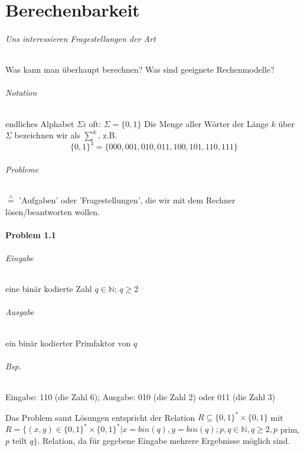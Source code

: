 \part{Berechenbarkeit}

\paragraph*{Uns interessieren Fragestellungen der Art} Was kann man überhaupt berechnen? Was sind geeignete Rechenmodelle?

\paragraph*{Notation} endliches Alphabet $\Sigma i$ oft: $\Sigma = \{ 0,1 \}$ Die Menge aller Wörter der Länge $k$ über $\Sigma$ bezeichnen wir als $\sum\limits^k$, z.B.  $$ \{ 0,1 \}^3 = \{ 000,001,010,011,100,101,110,111 \} $$

\paragraph*{Probleme} $\overset{\wedge}{=}$ 'Aufgaben' oder 'Fragestellungen', die wir mit dem Rechner lösen/beantworten wollen.


\subsection*{Problem 1.1}
\paragraph*{Eingabe} eine binär kodierte Zahl $q \in \mathbb{N}$; $q \geq 2$

\paragraph*{Ausgabe} ein binär kodierter Primfaktor von $q$

\paragraph*{Bsp.} Eingabe: 110 (die Zahl 6); Ausgabe: 010 (die Zahl 2) oder 011 (die Zahl 3)

\par\medskip
Das Problem samt Lösungen entspricht der Relation $R \subseteq \{ 0,1 \}^* \times \{ 0,1 \}$ mit $R=\{ (x,y) \in \{ 0,1 \}^* \times \{ 0,1 \}^* | x=bin(q), y=bin(q); p,q \in \mathbb{N}, q \geq 2, p$ prim, $p$ teilt $q \}$. Relation, da für gegebene Eingabe mehrere Ergebnisse möglich sind.
\par\medskip

